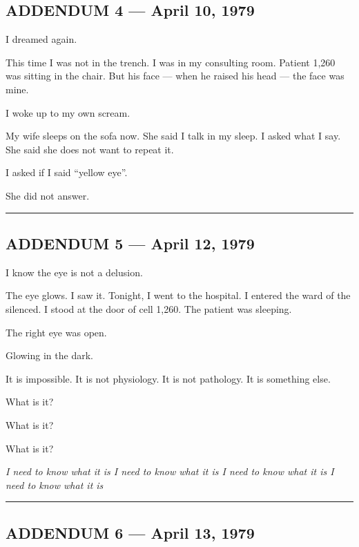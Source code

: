 \subsection*{ADDENDUM 4 --- April 10, 1979}

\noindent I dreamed again.

\noindent This time I was not in the trench. I was in my consulting room. Patient 1,260 was sitting in the chair. But his face --- when he raised his head --- the face was mine.

\noindent I woke up to my own scream.

\noindent My wife sleeps on the sofa now. She said I talk in my sleep. I asked what I say. She said she does not want to repeat it.

\noindent I asked if I said \textquotedblleft{}yellow eye\textquotedblright{}.

\noindent She did not answer.

\vspace{0.5em}\noindent\rule{\textwidth}{0.5pt}\vspace{0.5em}

\subsection*{ADDENDUM 5 --- April 12, 1979}

\noindent I know the eye is not a delusion.

\noindent The eye glows. I saw it. Tonight, I went to the hospital. I entered the ward of the silenced. I stood at the door of cell 1,260. The patient was sleeping.

\noindent The right eye was open.

\noindent Glowing in the dark.

\noindent It is impossible. It is not physiology. It is not pathology. It is something else.

\noindent What is it?

\noindent What is it?

\noindent What is it?

\noindent \textit{I need to know what it is I need to know what it is I need to know what it is I need to know what it is}

\vspace{0.5em}\noindent\rule{\textwidth}{0.5pt}\vspace{0.5em}

\subsection*{ADDENDUM 6 --- April 13, 1979}

